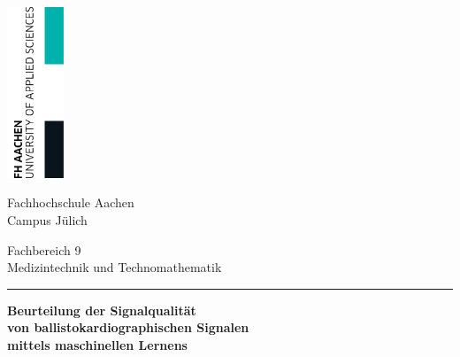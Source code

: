 \begin{titlepage}

	\thispagestyle{empty}
	

	\begin{flushright}
		\includegraphics[width=1.7cm]{./pic/FHAC.jpg}
	\end{flushright}
	
	\vspace{-3.5cm}


	\centering \begin{bfseries} \Large Fachhochschule Aachen\\
	\normalsize Campus Jülich\end{bfseries}

	\vspace{1cm}
	\normalsize
	Fachbereich 9\\
	Medizintechnik und Technomathematik
	
	\vspace{0.5cm}
	
	\centering \rule{0.75\textwidth}{1pt}
	
	\vspace{0.5cm}

	\centering \begin{minipage}[t]{17cm}
		\centering \bfseries \huge Beurteilung der Signalqualität\\von ballistokardiographischen Signalen\\mittels maschinellen Lernens\medskip
	\end{minipage}


\end{titlepage}
